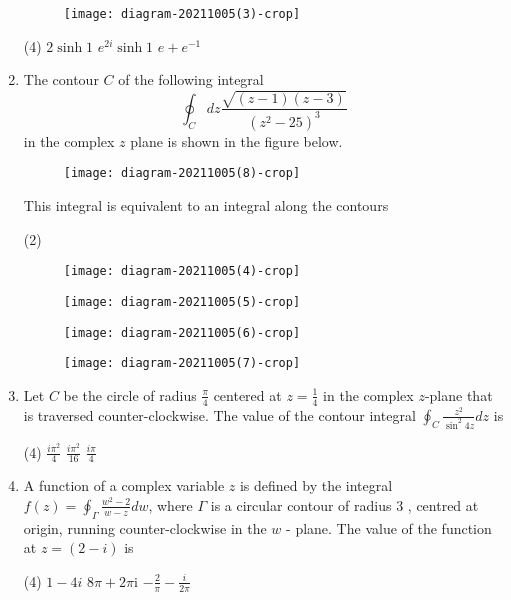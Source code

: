 \begin{enumerate}[label=\color{ocre}\textbf{\arabic*.}]
	{}
	\begin{figure}[H]
		\centering
		\texttt{[image: diagram-20211005(3)-crop]}
	\end{figure}
	\begin{tasks}(4)
		\task[\textbf{B.}] $2 \sinh 1$
		\task[\textbf{C.}]  $e^{2 i} \sinh 1$
		\task[\textbf{D.}] $e+e^{-1}$
	\end{tasks}
	\item The contour $C$ of the following integral
	$$
	\oint_{C} d z \frac{\sqrt{(z-1)(z-3)}}{\left(z^{2}-25\right)^{3}}
	$$
	in the complex $z$ plane is shown in the figure below.\\
	\begin{figure}[H]
		\centering
		\texttt{[image: diagram-20211005(8)-crop]}
	\end{figure}
	This integral is equivalent to an integral along the contours
	{}
	\begin{tasks}(2)
		\task[\textbf{A.}] \begin{figure}[H]
			\centering
			\texttt{[image: diagram-20211005(4)-crop]}
		\end{figure}
		\task[\textbf{B.}] \begin{figure}[H]
			\centering
			\texttt{[image: diagram-20211005(5)-crop]}
		\end{figure}
		\task[\textbf{C.}] \begin{figure}[H]
			\centering
			\texttt{[image: diagram-20211005(6)-crop]}
		\end{figure}
		\task[\textbf{D.}] \begin{figure}[H]
			\centering
			\texttt{[image: diagram-20211005(7)-crop]}
		\end{figure}
	\end{tasks}
	\item  Let $C$ be the circle of radius $\frac{\pi}{4}$ centered at $z=\frac{1}{4}$ in the complex $z$-plane that is traversed counter-clockwise. The value of the contour integral $\oint_{C} \frac{z^{2}}{\sin ^{2} 4 z} d z$ is
	{}
	\begin{tasks}(4)
		\task[\textbf{B.}] $\frac{i \pi^{2}}{4}$
		\task[\textbf{C.}] $\frac{i \pi^{2}}{16}$
		\task[\textbf{D.}] $\frac{i \pi}{4}$
	\end{tasks}
	\item  A function of a complex variable $z$ is defined by the integral $f(z)=\oint_{\Gamma} \frac{w^{2}-2}{w-z} d w$, where $\Gamma$ is a circular contour of radius 3 , centred at origin, running counter-clockwise in the $w$ - plane. The value of the function at $z=(2-i)$ is
	{}
	\begin{tasks}(4)
		\task[\textbf{B.}] $1-4 i$
		\task[\textbf{C.}]  $8 \pi+2 \pi \mathrm{i}$
		\task[\textbf{D.}] $-\frac{2}{\pi}-\frac{i}{2 \pi}$
	\end{tasks}
\end{enumerate}
